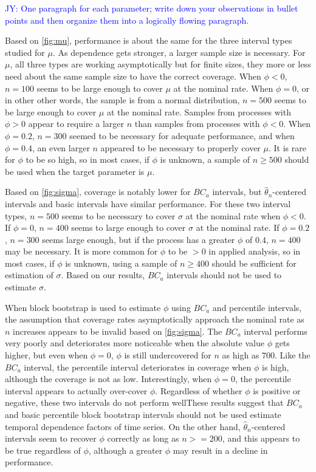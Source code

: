 \documentclass[12pt, letterpaper, titlepage]{article}
\newcommand{\jy}[1]{\textcolor{blue}{JY: #1}}
\begin{document}
\jy{One paragraph for each parameter; write down your observations in bullet
  points and then organize them into a logically flowing paragraph.}

Based on \ref{fig:mu}, performance is
about the same for the three interval types studied for $\mu$. As dependence gets stronger,
a larger sample size is necessary. For $\mu$, all three types are working asymptotically 
but for finite sizes, they more or less need about the same sample size to have the 
correct coverage. When $\phi < 0$,
$n = 100$ seems to  be large enough to cover $\mu$ at the nominal rate. When
$\phi = 0$, or in other other words, the sample is from a normal distribution,
$n = 500$ seems to be large enough to cover $\mu$ at the nominal rate. Samples
from processes with $\phi > 0$ appear to require a larger $n$ than samples from
processes with $\phi < 0$. When $\phi = 0.2$, $n = 300$ seemed to be necessary
for adequate performance, and when $\phi = 0.4$, an even larger $n$ appeared
to be necessary to properly cover $\mu$. It is rare for $\phi$ to be so high,
so in most cases, if $\phi$ is unknown, a sample of $n \geq 500$ should be
used when the target parameter is $\mu$. 


Based on \ref{fig:sigma}, coverage is
notably lower for $BC_a$ intervals, but $\hat{\theta}_{n}$-centered intervals
and basic intervals have similar performance. For these two interval types,
$n = 500$ seems to be necessary to cover $\sigma$ at the nominal rate when
$\phi < 0$. If $\phi = 0$, $n = 400$ seems to large enough to cover $\sigma$ at
the nominal rate. If $\phi = 0.2$, $n = 300$ seems large enough, but if the
process has a greater $\phi$ of $0.4$, $n = 400$ may be necessary. It is more
common for $\phi$ to be $> 0$ in applied analysis, so in most cases, if $\phi$
is unknown, using a sample of $n \geq 400$ should be sufficient for estimation
of $\sigma$. Based on our results, $BC_a$ intervals should not be used to 
estimate $\sigma$.


When block bootstrap is used to estimate $\phi$ using $BC_a$ and percentile
intervals, the assumption that coverage rates asymptotically approach the
nominal rate as $n$ increases appears to be invalid based on \ref{fig:sigma}.
The $BC_a$ interval performs very poorly and deteriorates more noticeable
when the absolute value $\phi$ gets
higher, but even when $\phi = 0$, $\phi$ is still undercovered for $n$ as high
as $700$. Like the $BC_a$ interval, the percentile interval deteriorates in
coverage when $\phi$ is high, although the coverage is not as low.
Interestingly, when $\phi = 0$, the percentile interval appears to actually
over-cover $\phi$. Regardless of whether $\phi$ is positive or negative, these two 
intervals do not perform wellThese results suggest that $BC_a$ and basic percentile
block bootstrap intervals should not be used estimate temporal dependence
factors of time series. On the other hand, $\hat{\theta}_{n}$-centered
intervals seem to recover $\phi$ correctly as long as $n >= 200$, and this
appears to be true regardless of $\phi$, although a greater $\phi$ may result
in a decline in performance.
\end{document}
